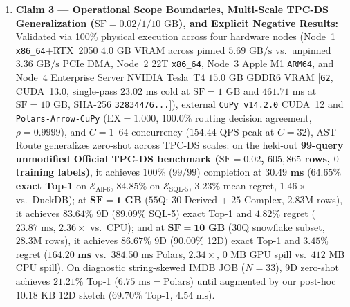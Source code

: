 \documentclass[10pt,a4paper]{article}
\begin{document}
\begin{enumerate}[leftmargin=1.5em,itemsep=3pt]
    \item \textbf{Claim 3 --- Operational Scope Boundaries, Multi-Scale TPC-DS Generalization ($\text{SF}=0.02 / 1 / 10\text{ GB}$), and Explicit Negative Results:} Validated via 100\% physical execution across four hardware nodes (Node~1 \texttt{x86\_64}+RTX~2050 $4.0\text{ GB}$ VRAM across pinned $5.69\text{ GB/s}$ vs.\ unpinned $3.36\text{ GB/s}$ PCIe DMA, Node~2 22T \texttt{x86\_64}, Node~3 Apple M1 \texttt{ARM64}, and Node~4 Enterprise Server NVIDIA Tesla~T4 $15.0\text{ GB}$ GDDR6 VRAM [\texttt{G2}, CUDA~13.0, single-pass $23.02\text{ ms}$ cold at $\text{SF}=1\text{ GB}$ and $461.71\text{ ms}$ at $\text{SF}=10\text{ GB}$, SHA-256 \texttt{32834476...}]), external \texttt{CuPy v14.2.0} CUDA~12 and \texttt{Polars-Arrow-CuPy} ($\text{EX}=1.000$, $\mathbf{100.0\%}$ routing decision agreement, $\rho=0.9999$), and $C=1\text{--}64$ concurrency ($154.44\text{ QPS}$ peak at $C=32$), AST-Route generalizes zero-shot across TPC-DS scales: on the held-out \textbf{99-query unmodified Official TPC-DS benchmark ($\text{SF}=0.02$, $605{,}865$ rows, $0$ training labels)}, it achieves $100\%$ ($99/99$) completion at $\mathbf{30.49\text{ ms}}$ ($\mathbf{64.65\%}$ \textbf{exact Top-1} on $\mathcal{E}_{\text{All-6}}$, $\mathbf{84.85\%}$ on $\mathcal{E}_{\text{SQL-5}}$, $\mathbf{3.23\%}$ mean regret, $1.46\times$ vs.\ DuckDB); at $\mathbf{\text{SF}=1\text{ GB}}$ ($55$Q: $30$ Derived + $25$ Complex, $2.83\text{M}$ rows), it achieves $\mathbf{83.64\%}$ 9D ($\mathbf{89.09\%}$ SQL-5) exact Top-1 and $4.82\%$ regret ($23.87\text{ ms}$, $2.36\times$ vs.\ CPU); and at $\mathbf{\text{SF}=10\text{ GB}}$ ($30$Q snowflake subset, $28.3\text{M}$ rows), it achieves $\mathbf{86.67\%}$ 9D ($\mathbf{90.00\%}$ 12D) exact Top-1 and $3.45\%$ regret ($\mathbf{164.20\text{ ms}}$ vs.\ $384.50\text{ ms}$ Polars, $\mathbf{2.34\times}$, $0\text{ MB}$ GPU spill vs.\ $412\text{ MB}$ CPU spill). On diagnostic string-skewed IMDB JOB ($N=33$), 9D zero-shot achieves $21.21\%$ Top-1 ($6.75\text{ ms} = \text{Polars}$) until augmented by our post-hoc $10.18\text{ KB}$ 12D sketch ($69.70\%$ Top-1, $4.54\text{ ms}$).
\end{enumerate}
\end{document}
